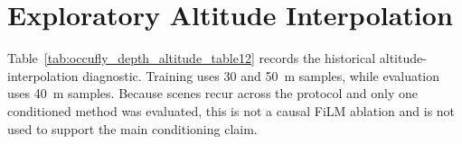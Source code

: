 \section{Exploratory Altitude Interpolation}
\label{app:altitude_interpolation}

Table~\ref{tab:occufly_depth_altitude_table12} records the historical altitude-interpolation diagnostic. Training uses 30 and 50~m samples, while evaluation uses 40~m samples. Because scenes recur across the protocol and only one conditioned method was evaluated, this is not a causal FiLM ablation and is not used to support the main conditioning claim.

\begin{table}[t]
\centering
\caption{Exploratory altitude-interpolation result. The protocol is not scene-disjoint and contains no matched unconditioned control.}
\label{tab:occufly_depth_altitude_table12}
\end{table}
